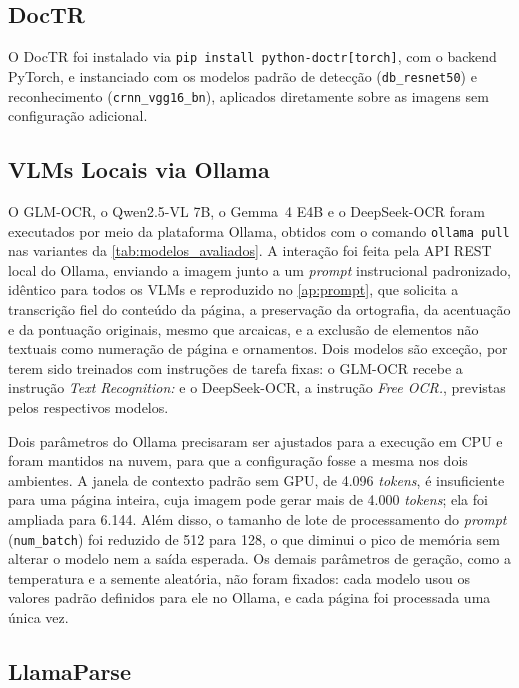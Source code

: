 \documentclass[noabntexcite,oneside]{ufsc-thesis-rn46-2019}
\begin{document}
\subsection{DocTR}

O DocTR foi instalado via \texttt{pip install python-doctr[torch]}, com o backend PyTorch,
e instanciado com os modelos padrão de detecção (\texttt{db\_resnet50}) e reconhecimento
(\texttt{crnn\_vgg16\_bn}), aplicados diretamente sobre as imagens sem configuração
adicional.

\subsection{VLMs Locais via Ollama}

O GLM-OCR, o Qwen2.5-VL 7B, o Gemma~4 E4B e o DeepSeek-OCR foram executados por meio da
plataforma Ollama, obtidos com o comando \texttt{ollama pull} nas variantes da
\autoref{tab:modelos_avaliados}. A interação foi feita pela API REST local do Ollama,
enviando a imagem junto a um \textit{prompt} instrucional padronizado, idêntico para todos
os VLMs e reproduzido no \autoref{ap:prompt}, que solicita a transcrição fiel do conteúdo da página, a preservação da
ortografia, da acentuação e da pontuação originais, mesmo que arcaicas, e a exclusão de
elementos não textuais como numeração de página e ornamentos. Dois modelos são exceção, por
terem sido treinados com instruções de tarefa fixas: o GLM-OCR recebe a instrução
\textit{Text Recognition:} e o DeepSeek-OCR, a instrução \textit{Free OCR.}, previstas
pelos respectivos modelos.

Dois parâmetros do Ollama precisaram ser ajustados para a execução em CPU e foram mantidos
na nuvem, para que a configuração fosse a mesma nos dois ambientes. A janela de contexto
padrão sem GPU, de 4.096 \textit{tokens}, é insuficiente para uma página inteira, cuja
imagem pode gerar mais de 4.000 \textit{tokens}; ela foi ampliada para 6.144. Além disso, o
tamanho de lote de processamento do \textit{prompt} (\texttt{num\_batch}) foi reduzido de
512 para 128, o que diminui o pico de memória sem alterar o modelo nem a saída esperada.
Os demais parâmetros de geração, como a temperatura e a semente aleatória, não foram
fixados: cada modelo usou os valores padrão definidos para ele no Ollama, e cada página
foi processada uma única vez.

\subsection{LlamaParse}
\end{document}
